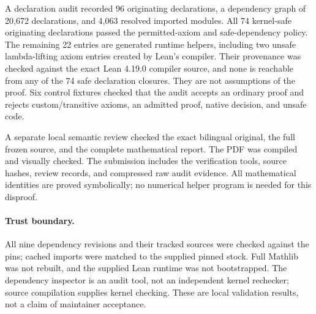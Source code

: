 \documentclass[11pt]{article}
\begin{document}
A declaration audit recorded 96 originating declarations, a dependency graph of
20,672 declarations, and 4,063 resolved imported modules. All 74 kernel-safe
originating declarations passed the permitted-axiom and safe-dependency policy.
The remaining 22 entries are generated runtime helpers, including two unsafe
lambda-lifting axiom entries created by Lean's compiler. Their provenance was
checked against the exact Lean 4.19.0 compiler source, and none is reachable from
any of the 74 safe declaration closures. They are not assumptions of the proof.
Six control fixtures checked that the audit accepts an ordinary proof and rejects
custom/transitive axioms, an admitted proof, native decision, and unsafe code.

A separate local semantic review checked the exact bilingual original, the full
frozen source, and the complete mathematical report. The PDF was compiled and
visually checked. The submission includes the verification tools, source hashes,
review records, and compressed raw audit evidence. All mathematical identities
are proved symbolically; no numerical helper program is needed for this disproof.

\paragraph{Trust boundary.}
All nine dependency revisions and their tracked sources were checked against the
pins; cached imports were matched to the supplied pinned stock. Full Mathlib was
not rebuilt, and the supplied Lean runtime was not bootstrapped. The dependency
inspector is an audit tool, not an independent kernel rechecker; source compilation
supplies kernel checking. These are local validation results, not a claim of
maintainer acceptance.
\end{document}
